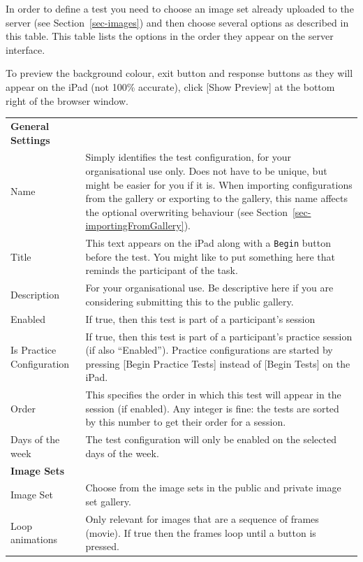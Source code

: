 \documentclass{article}
\begin{document}
In order to define a test you need to choose an image set already
uploaded to the server (see Section~\ref{sec-images}) and then choose
several options as described in this table. This table lists the
options in the order they appear on the server interface.

To preview the background colour, exit button and response buttons as they will appear on the iPad (not 100\% accurate), click [Show Preview] at the bottom right of the browser window.

\begin{longtable}{|p{5cm}|p{10cm}|}
\hline
{\bf General Settings}  & \\\nopagebreak
\hline
Name & Simply identifies the test configuration, for your organisational use only. Does not have to be unique, but might be easier for you if it is. When importing configurations from the gallery or exporting to the gallery, this name affects the optional overwriting behaviour (see Section~\ref{sec-importingFromGallery}). \\
\hline
Title & This text appears on the iPad along with a {\tt Begin} button
before the test.
You might like to put something here that reminds the participant of
the task.
\\
\hline
Description & For your organisational use. Be descriptive here if you are considering submitting this to the public gallery.\\
\hline
Enabled & If true, then this test is part of a participant's session\\
\hline
Is Practice Configuration & If true, then this test is part of a participant's practice session (if also ``Enabled''). Practice configurations are started by pressing [Begin Practice Tests] instead of [Begin Tests] on the iPad.\\
\hline
Order & This specifies the order in which this test will appear in 
the session (if enabled). Any integer is fine: the tests are sorted by this number to get their order for a session.\\
\hline
Days of the week & The test configuration will only be enabled 
on the selected days of the week.\\
\hline
\hline
{\bf Image Sets}  & \\\nopagebreak
Image Set & Choose from the image sets in the public and private image set gallery.\\
\hline
Loop animations & Only relevant for images that are a sequence of frames (movie). If true then the frames loop until a button is pressed.\\

\end{longtable}
\end{document}
